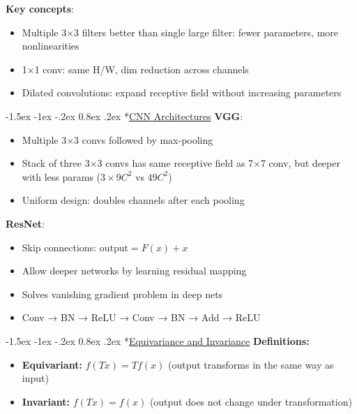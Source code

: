 \documentclass{article}
\makeatletter
\renewcommand\section{\@startsection{section}{1}{\z@}%
                                  {-1.5ex \@plus -1ex \@minus -.2ex}%
                                  {0.8ex \@plus.2ex}%
                                  {\normalfont\small\bfseries}}
\makeatother
\begin{document}
\begin{multicols}{3}
\textbf{Key concepts}:
\begin{itemize}
\item Multiple 3×3 filters better than single large filter: fewer parameters, more nonlinearities
\item 1×1 conv: same H/W, dim reduction across channels
\item Dilated convolutions: expand receptive field without increasing parameters
\end{itemize}

\section*{\underline{CNN Architectures}}
\textbf{VGG}:
\begin{itemize}
\item Multiple 3×3 convs followed by max-pooling
\item Stack of three 3×3 convs has same receptive field as 7×7 conv, but deeper with less params ($3\times 9C^2$ vs $49C^2$)
\item Uniform design: doubles channels after each pooling
\end{itemize}

\textbf{ResNet}:
\begin{itemize}
\item Skip connections: $\text{output} = F(x) + x$
\item Allow deeper networks by learning residual mapping
\item Solves vanishing gradient problem in deep nets
\item Conv → BN → ReLU → Conv → BN → Add → ReLU
\end{itemize}

\section*{\underline{Equivariance and Invariance}}
\textbf{Definitions:}
\begin{itemize}
  \item \textbf{Equivariant:} $f(Tx) = T f(x)$\hspace{0.5em} (output transforms in the same way as input)
  \item \textbf{Invariant:} $f(Tx) = f(x)$\hspace{0.5em} (output does not change under transformation)
\end{itemize}


\end{multicols}
\end{document}

